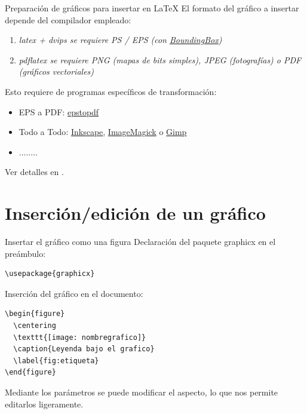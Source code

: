 \documentclass[10pt]{beamer}
\begin{document}
\begin{frame}{Preparaci\'on de gr\'aficos para insertar en \LaTeX}
El formato del gr\'afico a insertar depende del compilador empleado:
\begin{enumerate}
\item \it{latex + dvips}  se requiere PS / EPS {\scriptsize(con \href{http://tex.stackexchange.com/questions/133786/no-boundingbox-error-message}{BoundingBox})}
\item \it {pdflatex} se requiere PNG {\scriptsize(mapas de bits simples)}, JPEG {\scriptsize(fotograf\'ias)} o PDF {\scriptsize(gr\'aficos vectoriales)}
\end{enumerate}

\vspace{0.5cm}
Esto requiere de programas espec\'ificos de transformaci\'on:
\begin{itemize}
\item {\sc EPS a PDF}: \href{http://tug.org/epstopdf/}{epstopdf}
\item {\sc Todo a Todo}: \href{http://www.inkscape.org/es/}{Inkscape}, 
\href{http://www.imagemagick.org}{ImageMagick} o \href{http://www.gimp.org/}{Gimp}
\item ........
\end{itemize}
Ver detalles en \cite{ManualLatexWikilibros}.
\end{frame}

\section{Inserci\'on/edici\'on de un gr\'afico}
\begin{frame}[fragile]{Insertar el gr\'afico como una figura}
Declaraci\'on del paquete graphicx en el pre\'ambulo:
\begin{verbatim}\usepackage{graphicx} \end{verbatim}

Inserci\'on del gr\'afico en el documento:
\begin{verbatim}
\begin{figure}
  \centering
  \texttt{[image: nombregrafico]}
  \caption{Leyenda bajo el grafico}
  \label{fig:etiqueta}
\end{figure}
\end{verbatim}
Mediante los par\'ametros se puede modificar el aspecto, lo que 
nos permite editarlos ligeramente.
\end{frame}
\end{document}
